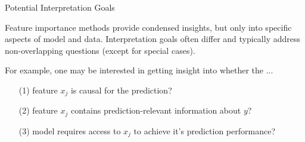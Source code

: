 \documentclass[11pt,compress,t,notes=noshow, aspectratio=169, xcolor=table]{beamer}
\begin{document}
\begin{frame}{Potential Interpretation Goals}

Feature importance methods provide condensed insights, but only into specific aspects of model and data. Interpretation goals often differ and typically address non-overlapping questions (except for special cases).

\lz 

For example, one may be interested in getting insight into whether the ...

\begin{enumerate}
    \item[(1)] feature $x_j$ is causal for the prediction?
    \item[(2)] feature $x_j$ contains prediction-relevant information about $y$?
    \item[(3)] model requires access to $x_j$ to achieve it's prediction performance?
\end{enumerate}
\end{frame}
\end{document}
